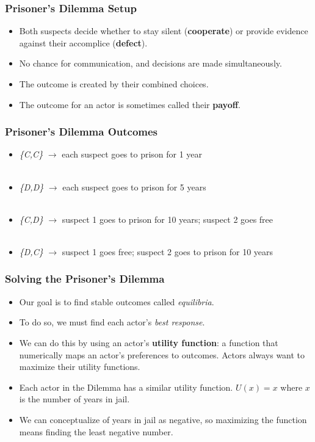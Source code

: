 \documentclass[handout]{beamer}
\begin{document}
\begin{frame} 
	\frametitle{\LARGE{Prisoner's Dilemma Setup}}
	\begin{itemize}
	\item Both suspects decide whether to stay silent (\textbf{cooperate}) or provide evidence against their accomplice (\textbf{defect}). \pause
	\item No chance for communication, and decisions are made simultaneously. \pause
	\item The outcome is created by their combined choices. \pause
	\item The outcome for an actor is sometimes called their \textbf{payoff}.
	\end{itemize}
\end{frame}


 \begin{frame} 
 \frametitle{\LARGE{Prisoner's Dilemma Outcomes}}
 	\begin{itemize}
 		\item \emph{\{C,C\}} $\rightarrow$ \pause each suspect goes to prison for 1 year \pause \\~\\
 		\item \emph{\{D,D\}} $\rightarrow$ \pause each suspect goes to prison for 5 years \pause \\~\\
 		\item \emph{\{C,D\}} $\rightarrow$ \pause suspect 1 goes to prison for 10 years; suspect 2 goes free  \pause \\~\\ 
 		\item \emph{\{D,C\}} $\rightarrow$ \pause suspect 1 goes free; suspect 2 goes to prison for 10 years
 	\end{itemize}
 \end{frame}

 \begin{frame} 
 \frametitle{\LARGE{Solving the Prisoner's Dilemma}}
 	\begin{itemize}
 		\item Our goal is to find stable outcomes called \emph{equilibria}. \pause
 		\item To do so, we must find each actor's \emph{best response}. \pause
 		\item We can do this by using an actor's \textbf{utility function}: a function that numerically maps an actor's preferences to outcomes. Actors always want to maximize their utility functions. \pause
 		\item Each actor in the Dilemma has a similar utility function. $U(x)=x$ where $x$ is the number of years in jail. \pause
 		\item We can conceptualize of years in jail as negative, so maximizing the function means finding the least negative number.
 	\end{itemize}
 \end{frame}
\end{document}
